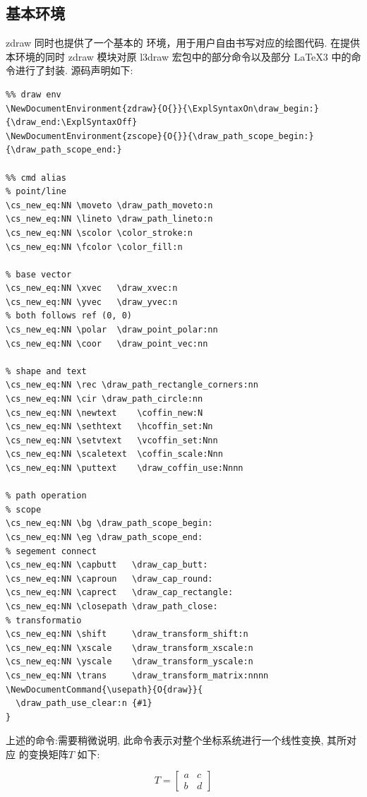 \subsection{基本环境}
zdraw 同时也提供了一个基本的 \index{\cmd{\zplot}} 环境，用于用户自由书写对应的绘图代码. 在提供本环境的同时
zdraw 模块对原 l3draw 宏包中的部分命令以及部分 \LaTeX{}3 中的命令进行了封装. 源码声明如下:
\begin{verbatim} 
%% draw env 
\NewDocumentEnvironment{zdraw}{O{}}{\ExplSyntaxOn\draw_begin:}{\draw_end:\ExplSyntaxOff}
\NewDocumentEnvironment{zscope}{O{}}{\draw_path_scope_begin:}{\draw_path_scope_end:}

%% cmd alias
% point/line
\cs_new_eq:NN \moveto \draw_path_moveto:n
\cs_new_eq:NN \lineto \draw_path_lineto:n
\cs_new_eq:NN \scolor \color_stroke:n
\cs_new_eq:NN \fcolor \color_fill:n

% base vector
\cs_new_eq:NN \xvec   \draw_xvec:n
\cs_new_eq:NN \yvec   \draw_yvec:n
% both follows ref (0, 0)
\cs_new_eq:NN \polar  \draw_point_polar:nn 
\cs_new_eq:NN \coor   \draw_point_vec:nn  

% shape and text
\cs_new_eq:NN \rec \draw_path_rectangle_corners:nn
\cs_new_eq:NN \cir \draw_path_circle:nn
\cs_new_eq:NN \newtext    \coffin_new:N
\cs_new_eq:NN \sethtext   \hcoffin_set:Nn
\cs_new_eq:NN \setvtext   \vcoffin_set:Nnn
\cs_new_eq:NN \scaletext  \coffin_scale:Nnn
\cs_new_eq:NN \puttext    \draw_coffin_use:Nnnn

% path operation
% scope
\cs_new_eq:NN \bg \draw_path_scope_begin:
\cs_new_eq:NN \eg \draw_path_scope_end:
% segement connect
\cs_new_eq:NN \capbutt   \draw_cap_butt:
\cs_new_eq:NN \caproun   \draw_cap_round:
\cs_new_eq:NN \caprect   \draw_cap_rectangle:
\cs_new_eq:NN \closepath \draw_path_close:
% transformatio
\cs_new_eq:NN \shift     \draw_transform_shift:n
\cs_new_eq:NN \xscale    \draw_transform_xscale:n
\cs_new_eq:NN \yscale    \draw_transform_yscale:n
\cs_new_eq:NN \trans     \draw_transform_matrix:nnnn
\NewDocumentCommand{\usepath}{O{draw}}{
  \draw_path_use_clear:n {#1}
}
\end{verbatim}

上述的命令:需要稍微说明, 此命令表示对整个坐标系统进行一个线性变换, 其所对应
的变换矩阵$T$ 如下:

\[
  T = \begin{bmatrix}
    a & c \\
    b & d
  \end{bmatrix}
\]

